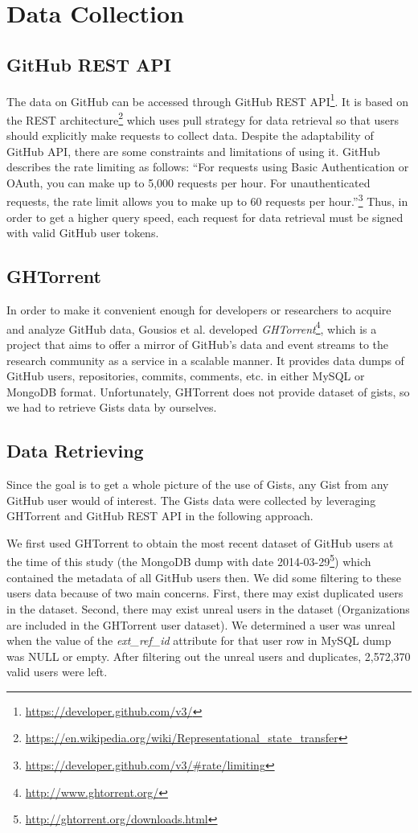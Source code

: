 \section{Data Collection}

\subsection{GitHub REST API}
The data on GitHub can be accessed through GitHub REST API\footnote{\url{https://developer.github.com/v3/}}. It is based on the REST architecture\footnote{\url{https://en.wikipedia.org/wiki/Representational_state_transfer}} which uses pull strategy for data retrieval so that users should explicitly make requests to collect data. Despite the adaptability of GitHub API, there are some constraints and limitations of using it. GitHub describes the rate limiting as follows: ``For requests using Basic Authentication or OAuth, you can make up to 5,000 requests per hour. For unauthenticated requests, the rate limit allows you to make up to 60 requests per hour.''\footnote{\url{https://developer.github.com/v3/\#rate/limiting}} Thus, in order to get a higher query speed, each request for data retrieval must be signed with valid GitHub user tokens.

\subsection{GHTorrent}
In order to make it convenient enough for developers or researchers to acquire and analyze GitHub data, Gousios et al. developed \textit{GHTorrent}\footnote{\url{http://www.ghtorrent.org/}}, which is a project that aims to offer a mirror of GitHub's data and event streams to the research community as a service in a scalable manner.\cite{6224294} It provides data dumps of GitHub users, repositories, commits, comments, etc. in either MySQL or MongoDB format. Unfortunately, GHTorrent does not provide dataset of gists, so we had to retrieve Gists data by ourselves. 

\subsection{Data Retrieving}
Since the goal is to get a whole picture of the use of Gists, any Gist from any GitHub user would of interest. The Gists data were collected by leveraging GHTorrent and GitHub REST API in the following approach. 

We first used GHTorrent to obtain the most recent dataset of GitHub users at the time of this study (the MongoDB dump with date 2014-03-29\footnote{\url{http://ghtorrent.org/downloads.html}}) which contained the metadata of all GitHub users then. We did some filtering to these users data because of two main concerns. First, there may exist duplicated users in the dataset. Second, there may exist unreal users in the dataset (Organizations are included in the GHTorrent user dataset\cite{Kalliamvakou:2014:PPM:2597073.2597074}). We determined a user was unreal when the value of the \textit{ext\_ref\_id} attribute for that user row in MySQL dump was NULL or empty. After filtering out the unreal users and duplicates, 2,572,370 valid users were left. 

